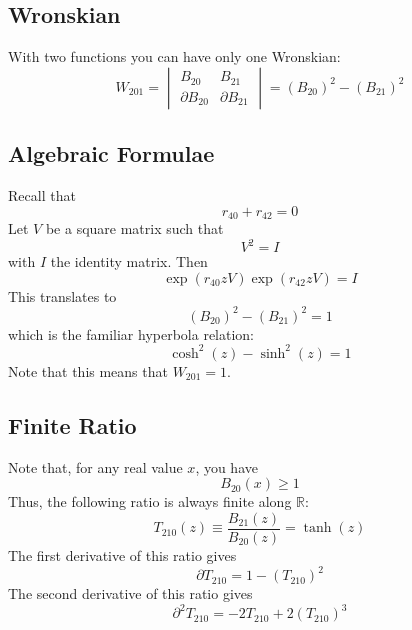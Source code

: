\subsection{Wronskian}
With two functions you can have only one Wronskian:
\begin{equation}
    W_{201} = \begin{vmatrix}
        B_{20} & B_{21} \\ \partial B_{20} & \partial B_{21}
    \end{vmatrix} = \left( B_{20} \right)^{2} - \left( B_{21} \right)^{2}
\end{equation}
\subsection{Algebraic Formulae}
Recall that
\begin{equation}
    r_{40} + r_{42} = 0
\end{equation}
Let $V$ be a square matrix such that
\begin{equation}
    V^{2} = I
\end{equation}
with $I$ the identity matrix. Then
\begin{equation}
    \exp\left(r_{40} z V\right) \exp\left(r_{42} z V\right) = I
\end{equation}
This translates to
\begin{equation}
    \left( B_{20} \right)^{2} - \left( B_{21} \right)^{2} = 1
\end{equation}
which is the familiar hyperbola relation:
\begin{equation}
    \cosh^{2}(z) - \sinh^{2}(z) = 1
\end{equation}
Note that this means that $W_{201} = 1$.
\subsection{Finite Ratio}
Note that, for any real value $x$, you have
\begin{equation}
    B_{20}(x) \geq 1
\end{equation}
Thus, the following ratio is always finite along $\mathbb{R}$:
\begin{equation}
    T_{210}(z) \equiv \frac{B_{21}(z)}{B_{20}(z)} = \tanh(z)
\end{equation}
The first derivative of this ratio gives
\begin{equation}
    \partial T_{210} = 1 - \left( T_{210} \right)^{2}
\end{equation}
The second derivative of this ratio gives
\begin{equation}
    \partial^{2} T_{210} = -2 T_{210} + 2\left( T_{210} \right)^{3}
\end{equation}
